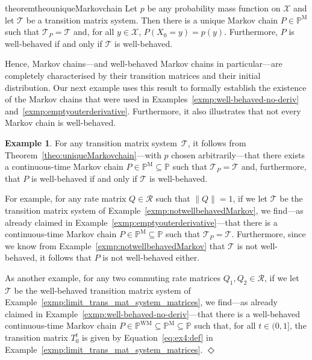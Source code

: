\documentclass[10pt,a4paper]{paper}
\theoremstyle{definition}
\newtheorem{exmp}{Example}
\newcommand{\states}{\mathcal{X}}
\newcommand{\processes}{\mathbb{P}}
\newcommand{\mprocesses}{\processes^{\mathrm{M}}}
\newcommand{\wmprocesses}{\processes^{\mathrm{WM}}}
\newcommand{\norm}[1]{\left\lVert #1 \right\rVert}
\newcommand{\exampleend}{\hfill$\Diamond$}
\begin{document}
\begin{restatable}{theorem}{theouniqueMarkovchain}
\label{theo:uniqueMarkovchain}
Let $p$ be any probability mass function on $\states$ and let $\mathcal{T}$ be a transition matrix system. Then there is a unique Markov chain $P\in\mprocesses$ such that $\mathcal{T}_P=\mathcal{T}$ and, for all $y\in\states$, $P(X_0=y)=p(y)$. Furthermore, $P$ is well-behaved if and only if $\mathcal{T}$ is well-behaved.
\end{restatable}

Hence, Markov chains---and well-behaved Markov chains in particular---are completely characterised by their transition matrices and their initial distribution. Our next example uses this result to formally establish the existence of the Markov chains that were used in Examples~\ref{exmp:well-behaved-no-deriv} and~\ref{exmp:emptyouterderivative}. Furthermore, it also illustrates that not every Markov chain is well-behaved.

\begin{exmp}\label{exmp:twoexamplesofMarkovchains}
For any transition matrix system~$\mathcal{T}$, it follows from Theorem~\ref{theo:uniqueMarkovchain}---with $p$ chosen arbitrarily---that there exists a continuous-time Markov chain $P\in\mprocesses\subseteq\processes$ such that $\mathcal{T}_P=\mathcal{T}$ and, furthermore, that $P$ is well-behaved if and only if $\mathcal{T}$ is well-behaved.

For example, for any rate matrix $Q\in\mathcal{R}$ such that $\norm{Q}=1$, if we let $\mathcal{T}$ be the transition matrix system of Example~\ref{exmp:notwellbehavedMarkov}, we find---as already claimed in Example~\ref{exmp:emptyouterderivative}---that there is a continuous-time Markov chain $P\in\mprocesses\subseteq\processes$ such that $\mathcal{T}_P=\mathcal{T}$. Furthermore, since we know from Example~\ref{exmp:notwellbehavedMarkov} that $\mathcal{T}$ is not well-behaved, it follows that $P$ is not well-behaved either.

As another example, for any two commuting rate matrices $Q_1,Q_2\in\mathcal{R}$, if we let $\mathcal{T}$ be the well-behaved transition matrix system of Example~\ref{exmp:limit_trans_mat_system_matrices}, we find---as already claimed in Example~\ref{exmp:well-behaved-no-deriv}---that there is a well-behaved continuous-time Markov chain $P\in\wmprocesses\subseteq\mprocesses\subseteq\processes$ such that, for all $t\in(0,1]$, the transition matrix $T_0^t$ is given by Equation~\eqref{eq:ex4:def} in Example~\ref{exmp:limit_trans_mat_system_matrices}.
\exampleend
\end{exmp}
\end{document}
